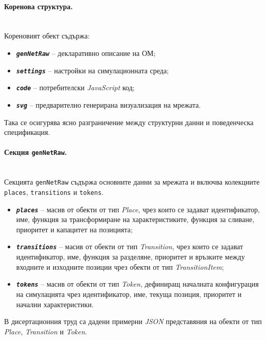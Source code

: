 \paragraph{Коренова структура.}\mbox{}\\
Кореновият обект съдържа:
\begin{itemize}
\item \texttt{\textbf{\textit{genNetRaw}}} -- декларативно описание на ОМ;
\item \texttt{\textbf{\textit{settings}}} -- настройки на симулационната среда;
\item \texttt{\textbf{\textit{code}}} -- потребителски \textit{JavaScript} код;
\item \texttt{\textbf{\textit{svg}}} -- предварително генерирана визуализация на мрежата.
\end{itemize}

Така се осигурява ясно разграничение между структурни данни и поведенческа спецификация.

\paragraph{Секция \texttt{genNetRaw}.}\mbox{}\\
Секцията \texttt{genNetRaw} съдържа основните данни за мрежата и включва колекциите \texttt{places}, \texttt{transitions} и \texttt{tokens}.

\begin{itemize}
\item \texttt{\textbf{\textit{places}}} -- масив от обекти от тип \textit{Place}, чрез които се задават идентификатор, име, функция за трансформиране на характеристиките, функция за сливане, приоритет и капацитет на позицията;
\item \texttt{\textbf{\textit{transitions}}} -- масив от обекти от тип \textit{Transition}, чрез които се задават идентификатор, име, функция за разделяне, приоритет и връзките между входните и изходните позиции чрез обекти от тип \textit{TransitionItem};
\item \texttt{\textbf{\textit{tokens}}} -- масив от обекти от тип \textit{Token}, дефиниращ началната конфигурация на симулацията чрез идентификатор, име, текуща позиция, приоритет и начални характеристики.
\end{itemize}

В дисертационния труд са дадени примерни \textit{JSON} представяния на обекти от тип \textit{Place}, \textit{Transition} и \textit{Token}.


